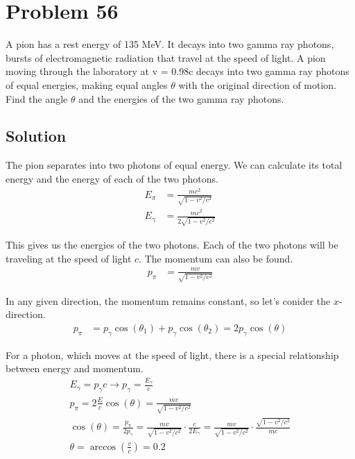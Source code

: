 \documentclass[12pt]{report}
\begin{document}
\pagebreak
\section{Problem 56}
    A pion has a rest energy of 135 MeV. 
    It decays into two gamma ray photons, bursts of electromagnetic radiation that travel at the speed of light. 
    A pion moving through the laboratory at v = 0.98c decays into two gamma ray photons of equal energies, making equal angles $\theta$ with the original direction of motion. 
    Find the angle $\theta$ and the energies of the two gamma ray photons.

    \subsection{Solution}
        The pion separates into two photons of equal energy.
        We can calculate its total energy and the energy of each of the two photons.
        \begin{align}
            E_\pi &= \frac{mc^2}{\sqrt{1 - v^2/c^2}}\\
            E_\gamma &= \frac{mc^2}{2\sqrt{1 - v^2/c^2}}
        \end{align}

        This gives us the energies of the two photons.
        Each of the two photons will be traveling at the speed of light $c$. 
        The momentum can also be found.
        \begin{align}
            p_{\pi} &=  \frac{mv}{\sqrt{1 - v^2/c^2}}
        \end{align}

        In any given direction, the momentum remains constant, so let's conider the $x$-direction.
        \begin{align}
            p_\pi   &=  p_\gamma \cos(\theta_1) + p_\gamma \cos(\theta_2)
                =   2p_\gamma \cos(\theta)
        \end{align}

        For a photon, which moves at the speed of light, there is a special relationship between energy and momentum.
        \begin{gather}
            E_\gamma   =   p_\gamma c \to p_\gamma = \frac{E_\gamma}{c}\\
            p_\pi = 2 \frac{E}{c} \cos(\theta) = \frac{mv}{\sqrt{1 - v^2/c^2}}\\
            \cos(\theta) = \frac{p_\pi}{2 p_\gamma}
                =   \frac{mv}{\sqrt{1 - v^2/c^2}} \cdot \frac{c}{2 E_\gamma}
                =   \frac{mv}{\sqrt{1 - v^2/c^2}} \cdot \frac{\sqrt{1 - v^2/c^2}}{mc}\\
            \theta  =   \arccos\left( \frac{v}{c} \right)
                =   \boxed{0.2}
        \end{gather}
\end{document}

